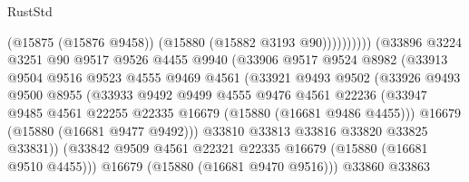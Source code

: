 \begin{lexlean}{RustStd}
\begin{coremodule}
                                          (@15875 (@15876 @9458))
                                          (@15880 (@15882 @3193 @90))))))))))
                          (@33896
                            @3224
                            @3251
                            @90
                            @9517
                            @9526
                            @4455
                            @9940
                            (@33906
                              @9517
                              @9524
                              @8982
                              (@33913
                                @9504
                                @9516
                                @9523
                                @4555
                                @9469
                                @4561
                                (@33921
                                  @9493
                                  @9502
                                  (@33926
                                    @9493
                                    @9500
                                    @8955
                                    (@33933
                                      @9492
                                      @9499
                                      @4555
                                      @9476
                                      @4561
                                      @22236
                                      (@33947
                                        @9485
                                        @4561
                                        @22255
                                        @22335
                                        @16679
                                        (@15880 (@16681 @9486 @4455)))
                                      @16679
                                      (@15880 (@16681 @9477 @9492)))
                                    @33810
                                    @33813
                                    @33816
                                    @33820
                                    @33825
                                    @33831))
                                (@33842
                                  @9509
                                  @4561
                                  @22321
                                  @22335
                                  @16679
                                  (@15880 (@16681 @9510 @4455)))
                                @16679
                                (@15880 (@16681 @9470 @9516)))
                              @33860
                              @33863

\end{coremodule}
\end{lexlean}
